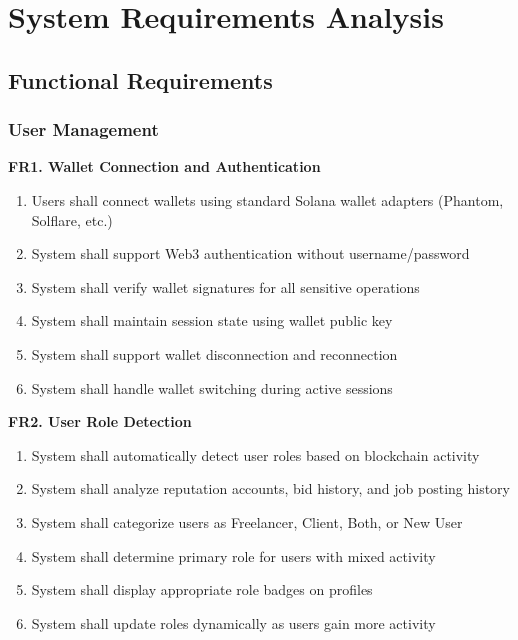 \documentclass[a4paper,13pt,twoside]{report}
\theoremstyle{definition}
\begin{document}
\section{System Requirements Analysis}

\subsection{Functional Requirements}

\subsubsection{User Management}

\textbf{FR1. Wallet Connection and Authentication}

\begin{enumerate}
    \item Users shall connect wallets using standard Solana wallet adapters (Phantom, Solflare, etc.)
    \item System shall support Web3 authentication without username/password
    \item System shall verify wallet signatures for all sensitive operations
    \item System shall maintain session state using wallet public key
    \item System shall support wallet disconnection and reconnection
    \item System shall handle wallet switching during active sessions
\end{enumerate}

\textbf{FR2. User Role Detection}

\begin{enumerate}
    \item System shall automatically detect user roles based on blockchain activity
    \item System shall analyze reputation accounts, bid history, and job posting history
    \item System shall categorize users as Freelancer, Client, Both, or New User
    \item System shall determine primary role for users with mixed activity
    \item System shall display appropriate role badges on profiles
    \item System shall update roles dynamically as users gain more activity
\end{enumerate}
\end{document}
